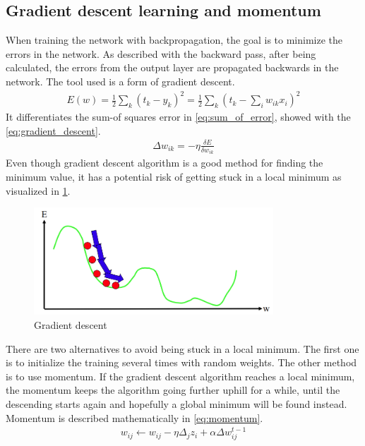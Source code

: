 \documentclass[USenglish]{ifimaster}  %
\begin{document}
\subsection{Gradient descent learning and momentum}
When training the network with backpropagation, the goal is to minimize the errors in the network. As described with the backward pass, after being calculated, the errors from the output layer are propagated backwards in the network. The tool used is a form of gradient descent. 
\begin{equation}\label{eq:sum_of_error}
\begin{aligned}
E(w) = \frac{1}{2} \sum_{k}(t_k - y_k)^2 = \frac{1}{2}\sum_{k}(t_k - \sum_{i} w_{ik}x_i)^2
\end{aligned}
\end{equation}
It differentiates the sum-of squares error in \cref{eq:sum_of_error}, showed with the \cref{eq:gradient_descent}.
\begin{equation}\label{eq:gradient_descent}
\begin{aligned}
\Delta w_{ik} = -\eta\frac{\delta E}{\delta w_{ik}}
\end{aligned}
\end{equation}
Even though gradient descent algorithm is a good method for finding the minimum value, it has a potential risk of getting stuck in a local minimum as visualized in \cref{fig:gradient_descent}.
\begin{figure}[H]
    \centering
    \includegraphics[width=0.8\textwidth]{bilder/gradient_descent.png}
    \caption{Gradient descent \cite{website:inf_4490_mlp}}
    \label{fig:gradient_descent}
\end{figure}
There are two alternatives to avoid being stuck in a local minimum. The first one is to initialize the training several times with random weights. The other method is to use momentum. If the gradient descent algorithm reaches a local minimum, the momentum keeps the algorithm going further uphill for a while, until the descending starts again and hopefully a global minimum will be found instead. Momentum is described mathematically in \cref{eq:momentum}. 
\begin{equation}\label{eq:momentum}
\begin{aligned}
w_{ij} \longleftarrow w_{ij} - \eta\Delta_j z_i+\alpha\Delta w^{t-1}_{ij}
\end{aligned}
\end{equation}
\end{document}

